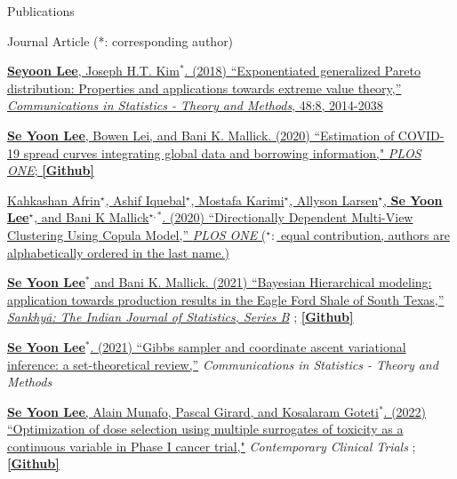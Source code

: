 \documentclass[
	11pt, %
]{resume} %
\begin{document}
\begin{rSection}{Publications}
\begin{rSubsection}{Journal Article (*: corresponding author)}{}{}{}
\item[] [1] \href{https://www.tandfonline.com/doi/pdf/10.1080/03610926.2018.1441418?needAccess=true}
{\underline{\textbf{Seyoon Lee}}, Joseph H.T. Kim$^{*}$. (2018) ``Exponentiated generalized Pareto distribution:
Properties and applications towards extreme
value theory,''
\textit{Communications in Statistics - Theory and Methods},
 48:8, 2014-2038}
\item[] [2] \href{https://journals.plos.org/plosone/article?id=10.1371/journal.pone.0236860}
{\underline{\textbf{Se Yoon Lee}}, Bowen Lei, and Bani K. Mallick. (2020)
``Estimation of COVID-19 spread curves integrating global data and borrowing information," \textit{PLOS ONE};
\href{https://github.com/StevenBoys/BHRM}{\underline{\textbf{[Github]}}}
}
\item[] [3] 
\href{https://journals.plos.org/plosone/article?id=10.1371/journal.pone.0238996}
{Kahkashan Afrin$^\star$,  Ashif Iquebal$^\star$, Mostafa Karimi$^\star$, Allyson Larsen$^\star$, \underline{\textbf{Se Yoon Lee}}$^\star$, and Bani K Mallick$^{\star,*}$. (2020) ``Directionally Dependent Multi-View Clustering Using Copula Model,'' \textit{PLOS ONE} ($^\star:$ equal contribution, authors are alphabetically ordered in the last name.)}
\item[] [4]
\href{https://rdcu.be/ceg4p}
{\underline{\textbf{Se Yoon Lee}$^{*}$} and Bani K. Mallick. (2021)
``Bayesian Hierarchical modeling: application towards
production results in the Eagle Ford Shale of South Texas,'' \textit{Sankhyā: The Indian Journal of Statistics, Series B}}
;
\href{https://github.com/yain22/SWM}{\underline{\textbf{[Github]}}}
\item[] [5]
\href{https://www.tandfonline.com/doi/full/10.1080/03610926.2021.1921214?src=}
{\underline{\textbf{Se Yoon Lee}$^{*}$}. (2021)
``Gibbs sampler and coordinate ascent variational inference: a set-theoretical review,''}
\textit{Communications in Statistics - Theory and Methods}
\item[][6]
\href{https://www.sciencedirect.com/science/article/pii/S1551714421003931}
{\underline{\textbf{Se Yoon Lee}}, Alain Munafo, Pascal Girard, and Kosalaram Goteti$^{*}$. (2022)
``Optimization of dose selection using multiple surrogates of toxicity as a continuous variable in Phase I cancer trial,"}
\textit{Contemporary Clinical Trials} ;
\href{https://github.com/yain22/2PLD}{\underline{\textbf{[Github]}}}

\end{rSubsection}
\end{rSection}
\end{document}
